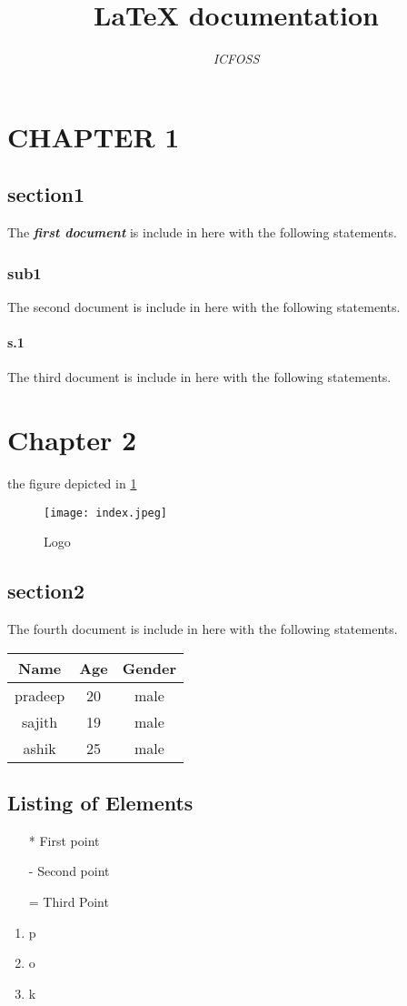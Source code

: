 \documentclass[13pt]{report} %
\begin{document}
\title{\textbf{ LaTeX documentation}}
\author{\textit{ ICFOSS}}
\maketitle
\chapter*{CHAPTER 1}

\section*{section1}
The \textbf{\textit{first document}} is include in here with the following statements.
\subsection*{sub1}The second document is include in here with the following statements.
\subsubsection*{s.1} 
The third document is include in here with the following statements.
\chapter*{Chapter 2}
the figure depicted in \ref{f:1}

\begin{figure}[H]
\centering   %
\texttt{[image: index.jpeg]}
\caption{Logo} %
\label{f:1}
\end{figure}
 
\section*{section2}
The fourth document is include in here with the following statements.

\begin{center}
\begin{tabular}{|      c      |      c      |      c      |}
\hline
Name & Age & Gender \\
\hline
pradeep & 20 & male\\
\hline
sajith & 19 & male \\
\hline
ashik & 25 & male \\
\hline
\end{tabular}
\end{center}

\section{Listing of Elements}
\begin{itemize}
\item [*]First point
\item[-] Second point
\item[=] Third Point
\end{itemize}

\begin{enumerate}[label=\Alph*]
\item p
\item o
\item k
\end{enumerate}
\end{document}
